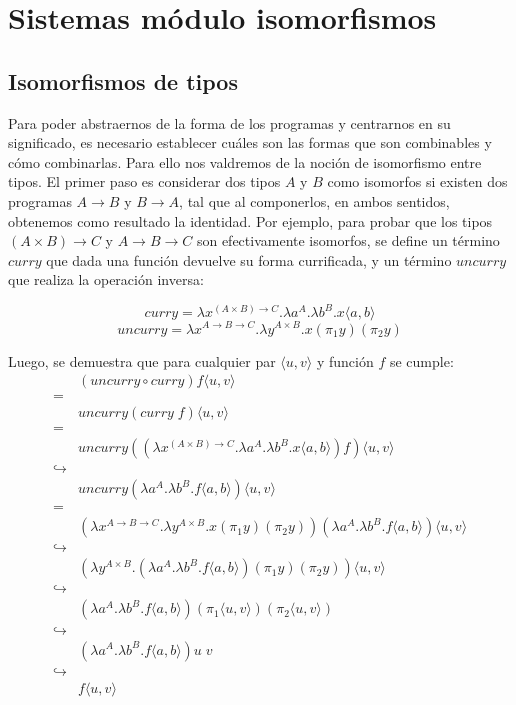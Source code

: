 \section{Sistemas módulo isomorfismos}
\subsection{Isomorfismos de tipos}

Para poder abstraernos de la forma de los programas y centrarnos en su significado, es necesario establecer cuáles son las formas que son combinables y cómo combinarlas.
Para ello nos valdremos de la noción de isomorfismo entre tipos.
El primer paso es considerar dos tipos $A$ y $B$ como isomorfos si existen dos programas $A \rightarrow B$ y $B \rightarrow A$, tal que al componerlos, en ambos sentidos, obtenemos como resultado la identidad.
Por ejemplo, para probar que los tipos $(A \times B) \rightarrow C$ y $A \rightarrow B \rightarrow C$ son efectivamente isomorfos, se define un término $curry$ que dada una función devuelve su forma currificada, y un término $uncurry$ que realiza la operación inversa:

\[ curry = \lambda x^{(A \times B) \rightarrow C}. \lambda a^A . \lambda b^B . x\langle a,b \rangle \]
\[ uncurry = \lambda x^{A \rightarrow B \rightarrow C}. \lambda y^{A \times B} . x(\pi_1 y)(\pi_2 y) \]

Luego, se demuestra que para cualquier par $\langle u,v \rangle$ y función $f$ se cumple:
{\allowdisplaybreaks
\begin{align*}
	& (uncurry \circ curry) f \langle u,v \rangle \\
	=& \\
	& uncurry (curry \; f) \langle u,v \rangle \\
	=& \\
	& uncurry ((\lambda x^{(A \times B) \rightarrow C}. \lambda a^A . \lambda b^B . x\langle a,b \rangle) f)  \langle u,v \rangle \\
	\hookrightarrow& \\
	& uncurry (\lambda a^A . \lambda b^B . f\langle a,b \rangle)  \langle u,v \rangle \\
	=& \\
	& (\lambda x^{A \rightarrow B \rightarrow C}. \lambda y^{A \times B} . x(\pi_1 y)(\pi_2 y)) (\lambda a^A . \lambda b^B . f\langle a,b \rangle)  \langle u,v \rangle \\
	\hookrightarrow& \\
	& (\lambda y^{A \times B} . (\lambda a^A . \lambda b^B . f\langle a,b \rangle)(\pi_1 y)(\pi_2 y)) \langle u,v \rangle \\
	\hookrightarrow& \\
	& (\lambda a^A . \lambda b^B . f\langle a,b \rangle)(\pi_1 \langle u,v \rangle)(\pi_2 \langle u,v \rangle) \\
	\hookrightarrow& \\
	& (\lambda a^A . \lambda b^B . f\langle a,b \rangle) u \; v \\
	\hookrightarrow& \\
	& f\langle u,v \rangle
\end{align*}
}

